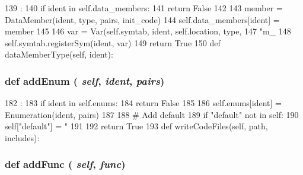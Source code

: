 \begin{DoxyCode}
139                                                           :
140         if ident in self.data_members:
141             return False
142 
143         member = DataMember(ident, type, pairs, init_code)
144         self.data_members[ident] = member
145 
146         var = Var(self.symtab, ident, self.location, type,
147                 "m_%
148         self.symtab.registerSym(ident, var)
149         return True
150 
    def dataMemberType(self, ident):
\end{DoxyCode}
\hypertarget{classslicc_1_1symbols_1_1Type_1_1Type_a31680a177e9d9fc678268e1723eb3906}{
\subsubsection[{addEnum}]{\setlength{\rightskip}{0pt plus 5cm}def addEnum ( {\em self}, \/   {\em ident}, \/   {\em pairs})}}
\label{classslicc_1_1symbols_1_1Type_1_1Type_a31680a177e9d9fc678268e1723eb3906}



\begin{DoxyCode}
182                                    :
183         if ident in self.enums:
184             return False
185 
186         self.enums[ident] = Enumeration(ident, pairs)
187 
188         # Add default
189         if "default" not in self:
190             self["default"] = "%
191 
192         return True
193 
    def writeCodeFiles(self, path, includes):
\end{DoxyCode}
\hypertarget{classslicc_1_1symbols_1_1Type_1_1Type_a8d499326f557cbeadeab18a84e8e0dc6}{
\subsubsection[{addFunc}]{\setlength{\rightskip}{0pt plus 5cm}def addFunc ( {\em self}, \/   {\em func})}}
\label{classslicc_1_1symbols_1_1Type_1_1Type_a8d499326f557cbeadeab18a84e8e0dc6}



